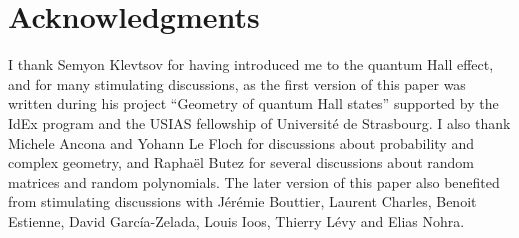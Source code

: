 \documentclass[12pt,a4paper,reqno]{article}
\theoremstyle{thmstyleone}
\theoremstyle{thmstylethree}
\theoremstyle{thmstyletwo}
\numberwithin{equation}{subsection}
\begin{document}
\section*{Acknowledgments}

I thank Semyon Klevtsov for having introduced me to the quantum Hall effect, and for many stimulating discussions, as the first version of this paper was written during his project ``Geometry of quantum Hall states'' supported by the IdEx program and the USIAS fellowship of Universit\'e de Strasbourg. I also thank Michele Ancona and Yohann Le Floch for discussions about probability and complex geometry, and Rapha\"el Butez for several discussions about random matrices and random polynomials. The later version of this paper also benefited from stimulating discussions with J\'er\'emie Bouttier, Laurent Charles, Benoit Estienne, David Garc\'ia-Zelada, Louis Ioos, Thierry L\'evy and Elias Nohra.



\end{document}
